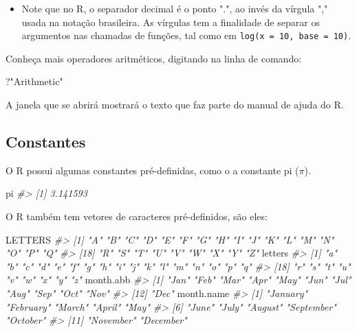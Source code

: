 \documentclass[]{book}
\newenvironment{Shaded}{\begin{snugshade}}{\end{snugshade}}
\newcommand{\StringTok}[1]{\textcolor[rgb]{0.31,0.60,0.02}{#1}}
\newcommand{\CommentTok}[1]{\textcolor[rgb]{0.56,0.35,0.01}{\textit{#1}}}
\newcommand{\NormalTok}[1]{#1}
\newenvironment{rmdblock}[1]
  {\begin{shaded*}
  \begin{itemize}
  \renewcommand{\labelitemi}{
    \raisebox{-.7\height}[0pt][0pt]{
      {\setkeys{Gin}{width=3em,keepaspectratio}\texttt{[image: images/\#1]}}
    }
  }
  \item
  }
  {
  \end{itemize}
  \end{shaded*}
  }
\newenvironment{rmdwarning}
  {\begin{rmdblock}{warning}}
  {\end{rmdblock}}
\begin{document}
\begin{rmdwarning}
Note que no R, o separador decimal é o ponto ".", ao invés da vírgula
"," usada na notação brasileira. As vírgulas tem a finalidade de separar
os argumentos nas chamadas de funções, tal como em
\texttt{log(x\ =\ 10,\ base\ =\ 10)}.
\end{rmdwarning}

Conheça mais operadores aritméticos, digitando na linha de comando:

\begin{Shaded}
\begin{Highlighting}[]
\NormalTok{?}\StringTok{"Arithmetic"}
\end{Highlighting}
\end{Shaded}

A janela que se abrirá mostrará o texto que faz parte do manual de ajuda
do {R}.

\subsection{Constantes}\label{constantes}

O R possui algumas constantes pré-definidas, como o a constante pi
(\(\pi\)).

\begin{Shaded}
\begin{Highlighting}[]
\NormalTok{pi}
\CommentTok{#> [1] 3.141593}
\end{Highlighting}
\end{Shaded}

O R também tem vetores de caracteres pré-definidos, são eles:

\begin{Shaded}
\begin{Highlighting}[]
\NormalTok{LETTERS}
\CommentTok{#>  [1] "A" "B" "C" "D" "E" "F" "G" "H" "I" "J" "K" "L" "M" "N" "O" "P" "Q"}
\CommentTok{#> [18] "R" "S" "T" "U" "V" "W" "X" "Y" "Z"}
\NormalTok{letters}
\CommentTok{#>  [1] "a" "b" "c" "d" "e" "f" "g" "h" "i" "j" "k" "l" "m" "n" "o" "p" "q"}
\CommentTok{#> [18] "r" "s" "t" "u" "v" "w" "x" "y" "z"}
\NormalTok{month.abb}
\CommentTok{#>  [1] "Jan" "Feb" "Mar" "Apr" "May" "Jun" "Jul" "Aug" "Sep" "Oct" "Nov"}
\CommentTok{#> [12] "Dec"}
\NormalTok{month.name}
\CommentTok{#>  [1] "January"   "February"  "March"     "April"     "May"      }
\CommentTok{#>  [6] "June"      "July"      "August"    "September" "October"  }
\CommentTok{#> [11] "November"  "December"}
\end{Highlighting}
\end{Shaded}
\end{document}
